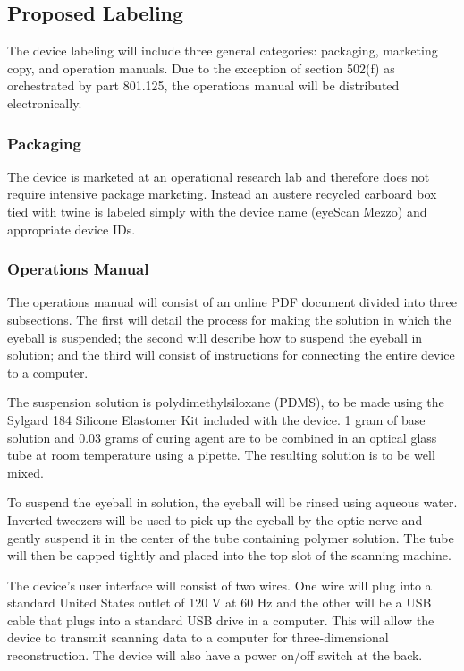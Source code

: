 \subsection{Proposed Labeling}

The device labeling will include three general categories: packaging,
marketing copy, and operation manuals. Due to the exception of section
502(f) as orchestrated by part 801.125, the operations manual will be
distributed electronically.

\subsubsection{Packaging}
The device is marketed at an operational research lab and therefore
does not require intensive package marketing. Instead an austere
recycled carboard box tied with twine is labeled simply with the
device name (eyeScan Mezzo) and appropriate device IDs.

\subsubsection{Operations Manual}
The operations manual will consist of an online PDF document divided
into three subsections. The first will detail the process for making
the solution in which the eyeball is suspended; the second will
describe how to suspend the eyeball in solution; and the third will
consist of instructions for connecting the entire device to a
computer.

The suspension solution is polydimethylsiloxane (PDMS), to be made
using the Sylgard 184 Silicone Elastomer Kit included with the device. 1 gram of base solution
and 0.03 grams of curing agent are to be combined in an optical glass
tube at room temperature using a pipette. The resulting solution is to
be well mixed.

To suspend the eyeball in solution, the eyeball will be rinsed
using aqueous water. Inverted tweezers will be used to pick up the
eyeball by the optic nerve and gently suspend it in the center of the
tube containing polymer solution. The tube will then be capped tightly
and placed into the top slot of the scanning machine.

The device’s user interface will consist of two wires. One wire will
plug into a standard United States outlet of 120 V at 60 Hz and the
other will be a USB cable that plugs into a standard USB drive in a
computer. This will allow the device to transmit scanning data to a
computer for three-dimensional reconstruction. The device will also
have a power on/off switch at the back.

